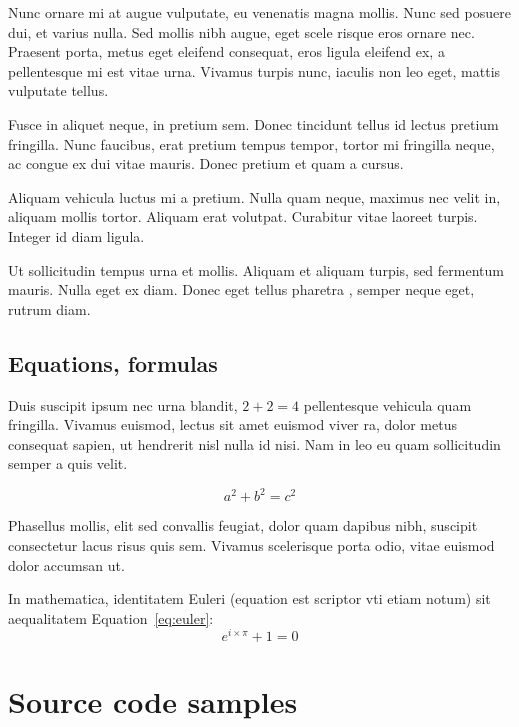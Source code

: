 \begin{remark}
Nunc ornare mi at augue vulputate, eu venenatis magna mollis. Nunc sed posuere dui, et varius nulla. Sed mollis nibh augue, eget scele
risque eros ornare nec. Praesent porta, metus eget eleifend consequat, eros ligula eleifend ex, a pellentesque mi est vitae urna. 
Vivamus turpis nunc, iaculis non leo eget, mattis vulputate tellus.
\end{remark}

Fusce in aliquet neque, in pretium sem. Donec tincidunt tellus id lectus pretium fringilla. Nunc faucibus, erat pretium tempus tempor,
 tortor mi fringilla neque, ac congue ex dui vitae mauris. Donec pretium et quam a cursus.

\begin{note}
Aliquam vehicula luctus mi a pretium. Nulla quam neque, maximus nec velit in, aliquam mollis tortor. Aliquam erat volutpat. Curabitur 
vitae laoreet turpis. Integer id diam ligula.
\end{note}

Ut sollicitudin tempus urna et mollis. Aliquam et aliquam turpis, sed fermentum mauris. Nulla eget ex diam. Donec eget tellus pharetra
, semper neque eget, rutrum diam.

\subsection{Equations, formulas}

Duis suscipit ipsum nec urna blandit, $2 + 2 = 4$ pellentesque vehicula quam fringilla. Vivamus euismod, lectus sit amet euismod viver
ra, dolor metus consequat sapien, ut hendrerit nisl nulla id nisi. Nam in leo eu quam sollicitudin semper a quis velit.

$$a^2 + b^2 = c^2$$

Phasellus mollis, elit sed convallis feugiat, dolor quam dapibus nibh, suscipit consectetur lacus risus quis sem. Vivamus scelerisque 
porta odio, vitae euismod dolor accumsan ut.

In mathematica, identitatem Euleri (equation est scriptor vti etiam notum) sit aequalitatem Equation~\ref{eq:euler}:
\begin{equation}\label{eq:euler}
e^{i \times \pi} + 1 = 0
\end{equation}


\section{Source code samples}

